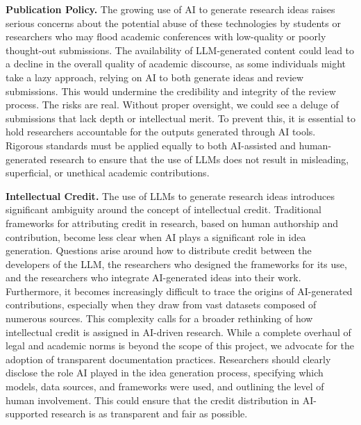 \textbf{Publication Policy.}
The growing use of AI to generate research ideas raises serious concerns about the potential abuse of these technologies by students or researchers who may flood academic conferences with low-quality or poorly thought-out submissions. The availability of LLM-generated content could lead to a decline in the overall quality of academic discourse, as some individuals might take a lazy approach, relying on AI to both generate ideas and review submissions. This would undermine the credibility and integrity of the review process.
%
The risks are real. Without proper oversight, we could see a deluge of submissions that lack depth or intellectual merit. To prevent this, it is essential to hold researchers accountable for the outputs generated through AI tools. Rigorous standards must be applied equally to both AI-assisted and human-generated research to ensure that the use of LLMs does not result in misleading, superficial, or unethical academic contributions.




\textbf{Intellectual Credit.}
The use of LLMs to generate research ideas introduces significant ambiguity around the concept of intellectual credit. Traditional frameworks for attributing credit in research, based on human authorship and contribution, become less clear when AI plays a significant role in idea generation. Questions arise around how to distribute credit between the developers of the LLM, the researchers who designed the frameworks for its use, and the researchers who integrate AI-generated ideas into their work.
%
Furthermore, it becomes increasingly difficult to trace the origins of AI-generated contributions, especially when they draw from vast datasets composed of numerous sources. This complexity calls for a broader rethinking of how intellectual credit is assigned in AI-driven research.
%
While a complete overhaul of legal and academic norms is beyond the scope of this project, we advocate for the adoption of transparent documentation practices. Researchers should clearly disclose the role AI played in the idea generation process, specifying which models, data sources, and frameworks were used, and outlining the level of human involvement. This could ensure that the credit distribution in AI-supported research is as transparent and fair as possible.


